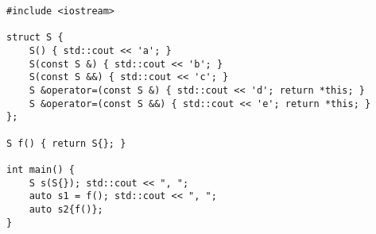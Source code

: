 \begin{lstlisting}[title=\href{https://godbolt.org/z/p7wfcb}{\texttt{godbolt.org/z/p7wfcb}}]
#include <iostream>

struct S {
    S() { std::cout << 'a'; }
    S(const S &) { std::cout << 'b'; }
    S(const S &&) { std::cout << 'c'; }
    S &operator=(const S &) { std::cout << 'd'; return *this; }
    S &operator=(const S &&) { std::cout << 'e'; return *this; }
};

S f() { return S{}; }

int main() {
    S s(S{}); std::cout << ", ";
    auto s1 = f(); std::cout << ", ";
    auto s2{f()};
}
\end{lstlisting}
